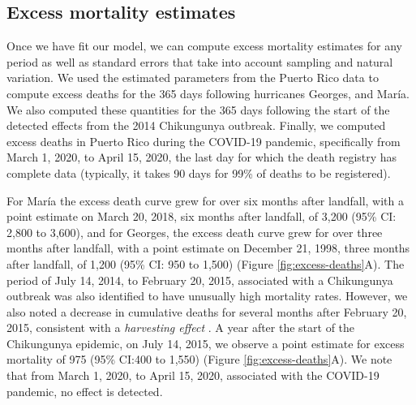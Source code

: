 \documentclass[11pt]{article}
\begin{document}
\subsection{Excess mortality estimates}
\label{subsec:excess-mortality}
Once we have fit our model, we can compute excess mortality estimates for any period as well as standard errors that take into account sampling and natural variation. We used the estimated parameters from the Puerto Rico data to compute excess deaths for the 365 days following hurricanes Georges, and Mar\'ia. We also computed these quantities for the 365 days following the start of the detected effects from the 2014 Chikungunya outbreak. Finally, we computed excess deaths in Puerto Rico during the COVID-19 pandemic, specifically from March 1, 2020, to April 15, 2020, the last day for which the death registry has complete data (typically, it takes 90 days for 99\% of deaths to be registered).

For Mar\'ia the excess death curve grew for over six months after landfall, with a point estimate on March 20, 2018, six months after landfall, of 3,200 (95\% CI: 2,800 to 3,600), and for Georges, the excess death curve grew for over three months after landfall, with a point estimate on December 21, 1998, three months after landfall, of 1,200 (95\% CI: 950 to 1,500) (Figure \ref{fig:excess-deaths}A). The period of July 14, 2014, to February 20, 2015, associated with a Chikungunya outbreak was also identified to have unusually high mortality rates. However, we also noted a decrease in cumulative deaths for several months after February 20, 2015, consistent with a \emph{harvesting effect} \cite{hajat2005mortality, dushoff2006mortality}. A year after the start of the Chikungunya epidemic, on July 14, 2015, we observe a point estimate for excess mortality of 975 (95\% CI:400 to 1,550) (Figure \ref{fig:excess-deaths}A). We note that from March 1, 2020, to April 15, 2020, associated with the COVID-19 pandemic, no effect is detected.
\end{document}

